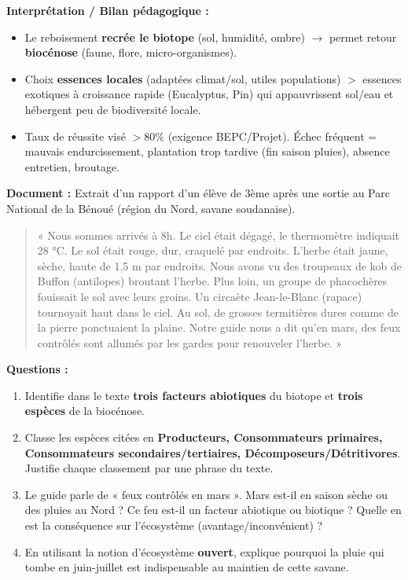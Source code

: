 \documentclass[11pt]{article}
\begin{document}
\begin{experience}
\textbf{Interprétation / Bilan pédagogique :}
\begin{itemize}
    \item Le reboisement \textbf{recrée le biotope} (sol, humidité, ombre) $\to$ permet retour \textbf{biocénose} (faune, flore, micro-organismes).
    \item Choix \textbf{essences locales} (adaptées climat/sol, utiles populations) $>$ essences exotiques à croissance rapide (Eucalyptus, Pin) qui appauvrissent sol/eau et hébergent peu de biodiversité locale.
    \item Taux de réussite visé $> 80\%$ (exigence BEPC/Projet). Échec fréquent = mauvais endurcissement, plantation trop tardive (fin saison pluies), absence entretien, broutage.
\end{itemize}
\end{experience}

\begin{exercice}
\textbf{Document :} Extrait d'un rapport d'un élève de 3ème après une sortie au Parc National de la Bénoué (région du Nord, savane soudanaise).
\begin{quote}
« Nous sommes arrivés à 8h. Le ciel était dégagé, le thermomètre indiquait 28 °C. Le sol était rouge, dur, craquelé par endroits. L'herbe était jaune, sèche, haute de 1,5 m par endroits. Nous avons vu des troupeaux de kob de Buffon (antilopes) broutant l'herbe. Plus loin, un groupe de phacochères fouissait le sol avec leurs groins. Un circaète Jean-le-Blanc (rapace) tournoyait haut dans le ciel. Au sol, de grosses termitières dures comme de la pierre ponctuaient la plaine. Notre guide nous a dit qu'en mars, des feux contrôlés sont allumés par les gardes pour renouveler l'herbe. »
\end{quote}
\textbf{Questions :}
\begin{enumerate}
    \item Identifie dans le texte \textbf{trois facteurs abiotiques} du biotope et \textbf{trois espèces} de la biocénose.
    \item Classe les espèces citées en \textbf{Producteurs, Consommateurs primaires, Consommateurs secondaires/tertiaires, Décomposeurs/Détritivores}. Justifie chaque classement par une phrase du texte.
    \item Le guide parle de « feux contrôlés en mars ». Mars est-il en saison sèche ou des pluies au Nord ? Ce feu est-il un facteur abiotique ou biotique ? Quelle en est la conséquence sur l'écosystème (avantage/inconvénient) ?
    \item En utilisant la notion d'écosystème \textbf{ouvert}, explique pourquoi la pluie qui tombe en juin-juillet est indispensable au maintien de cette savane.
\end{enumerate}
\end{exercice}
\end{document}
